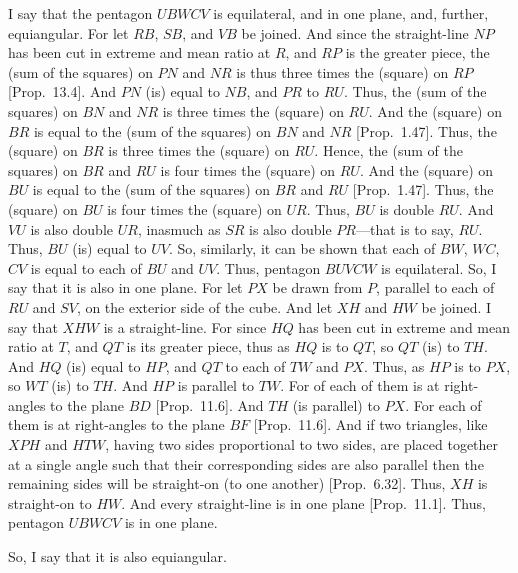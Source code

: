 \begin{Parallel}{}{}
{I say that the pentagon $UBWCV$ is equilateral, and in one plane, and,
further, equiangular. For let $RB$, $SB$, and $VB$ be joined. 
And since the straight-line $NP$ has been cut in extreme and mean
ratio at $R$, and $RP$ is the greater piece,  the (sum of the squares)
on $PN$ and $NR$ is thus three times the (square) on $RP$ [Prop.~13.4].
And $PN$ (is) equal to $NB$, and $PR$ to $RU$. 
Thus, the (sum of the squares) on $BN$ and $NR$ is three times the
(square) on $RU$. And the (square) on $BR$ is equal to the (sum of the squares) on $BN$ and $NR$ [Prop.~1.47].  
Thus, the (square) on $BR$ is three times the (square) on $RU$. 
Hence, the (sum of the
squares) on $BR$ and $RU$ is four times the (square) on $RU$. And
the (square)
on $BU$ is equal to the (sum of the squares) on $BR$ and $RU$ [Prop.~1.47]. Thus, the (square) on $BU$ is four times the
(square) on $UR$.  Thus, $BU$ is double $RU$.  And
$VU$ is also double $UR$, inasmuch as $SR$ is also double $PR$---that is to say, $RU$. Thus, $BU$ (is) equal to $UV$. So, similarly, it can be shown
that  each of $BW$, $WC$, $CV$ is equal to each of $BU$ and $UV$. 
Thus, pentagon $BUVCW$ is equilateral. So, I say that it is also in one plane. For let $PX$ be drawn from $P$, parallel to
each of $RU$ and $SV$, on the exterior side of the cube. And let
$XH$ and $HW$ be joined. I say that $XHW$ is a straight-line.
For since $HQ$ has been cut in extreme and mean ratio at $T$,
and  $QT$  is its greater piece, thus as $HQ$ is to $QT$, so $QT$
(is) to $TH$. And $HQ$ (is) equal to $HP$, and $QT$ to each of
$TW$ and $PX$. Thus, as $HP$ is to $PX$, so $WT$ (is) to
$TH$. And $HP$ is parallel to $TW$. For of each of them is at right-angles
to the plane $BD$ [Prop.~11.6]. And $TH$ (is parallel) to
$PX$. For each of them is at right-angles to the plane $BF$ [Prop.~11.6].
And if two triangles, like
$XPH$ and $HTW$, having two sides proportional to two sides,
are placed together at a single angle  such that their corresponding sides are also parallel then the remaining sides will be straight-on (to one another) [Prop.~6.32]. Thus, $XH$ is straight-on to
$HW$. And every straight-line is in one plane [Prop.~11.1]. Thus,
pentagon $UBWCV$ is in one plane.

So, I say that it is also equiangular.

}
\end{Parallel}
